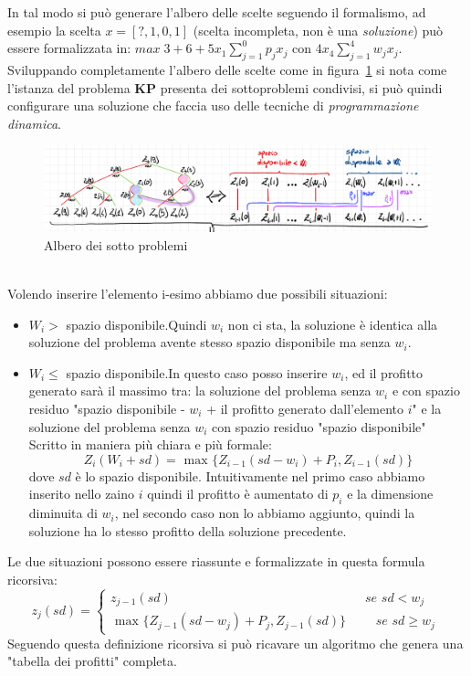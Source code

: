 \documentclass[a4paper]{article}
\begin{document}
In tal modo si può generare l'albero delle scelte seguendo il formalismo, ad esempio la scelta $x=[?,1, 0 ,1]$ (scelta incompleta, non è una \textit{soluzione}) può essere formalizzata in:
$max\; 3 + 6 +5x_1 \sum_{j=1}^0 p_jx_j \text{ con } 4x_4\sum_{j=1}^4 w_jx_j$.\\
Sviluppando completamente l'albero delle scelte come in figura~\ref{FIG:D1_albero} si nota come l'istanza del problema \textbf{KP} presenta dei sottoproblemi condivisi, si può quindi configurare una soluzione che faccia uso delle tecniche di \textit{programmazione dinamica}.
\begin{figure}[!ht]
\centering
\includegraphics[width=1\textwidth]{./img/D1_albero}
\caption{Albero dei sotto problemi} \label{FIG:D1_albero}
\end{figure}\\
Volendo inserire l'elemento i-esimo abbiamo due possibili situazioni:
\begin{itemize}
	\item$W_i >$ spazio disponibile.Quindi $w_i$ non ci sta, la soluzione è identica alla soluzione del problema avente stesso spazio disponibile ma senza $w_i$.
	\item$W_i \leq$ spazio disponibile.In questo caso posso inserire $w_i$, ed il profitto generato sarà il massimo tra: la soluzione del problema senza $w_i$ e con spazio residuo "spazio disponibile - $w_i$ + il profitto generato dall'elemento $i$" e la soluzione del problema senza $w_i$ con spazio residuo "spazio disponibile"
		Scritto in maniera più chiara e più formale: $$Z_i(W_i + sd)= \text{ max } \{ Z_{i-1}(sd - w_i) + P_i , Z_{i-1}(sd) \}$$ dove $sd$ è lo spazio disponibile.
		Intuitivamente nel primo caso abbiamo inserito nello zaino $i$ quindi il profitto è aumentato di $p_i$ e la dimensione diminuita di $w_i$, nel secondo caso non lo abbiamo aggiunto, quindi la soluzione ha lo stesso profitto della soluzione precedente.
\end{itemize}
Le due situazioni possono essere riassunte e formalizzate in questa formula ricorsiva:
\begin{equation*}
	z_j(sd)= \begin{cases} z_{j-1}(sd) \qquad \qquad \qquad \qquad \qquad \qquad \qquad \; \; \; \textit{ se } sd < w_j\\ 
	\text{ max } \{ Z_{j-1}(sd - w_j) + P_j , Z_{j-1}(sd) \} \qquad \textit{ se } sd \geq w_j\
\end{cases}
\end{equation*}
Seguendo questa definizione ricorsiva si può ricavare un algoritmo che genera una "tabella dei profitti" completa.
\end{document}
